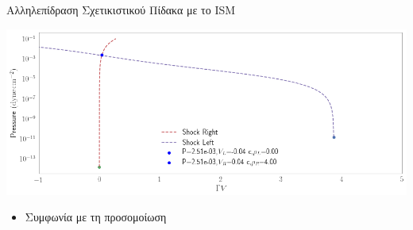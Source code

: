 \documentclass{beamer}
\begin{document}
\begin{frame}{Αλληλεπίδραση Σχετικιστικού Πίδακα με το ISM}
	
\begin{center}
	\includegraphics[width=1\linewidth]{../Document/DataImages/Shock-Shock}
\end{center}
\begin{itemize}
	\item{Συμφωνία με τη προσομοίωση}
\end{itemize}
\end{frame}
\end{document}
